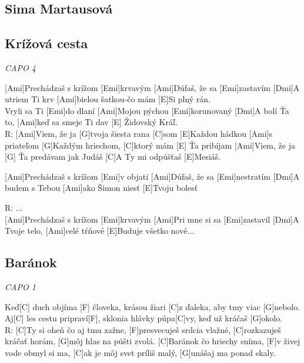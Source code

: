 \documentclass[10pt]{article}
\begin{document}
\begin{Large}
\section{Sima Martausová}

\begin{minipage}{\textwidth}
\subsection{Krížová cesta}
\textit{CAPO 4}
\begin{multicols}{2}
\begin{guitar}
	[Ami, Emi, Ami, Emi, Dm, Ami, E]
	
	[Ami]Prechádzaš s krížom [Emi]krvavým
	[Ami]Dúfaš, že sa [Emi]zastavím
	[Dmi]A utriem Ti krv [Ami]bielou šatkou-čo mám
	[E]Si plný rán.
	\\
	[Ami]Vryli sa Ti [Emi]do dlaní
	[Ami]Mojou pýchou [Emi]korunovaný
	[Dmi]A bolí Ťa to, [Ami]keď sa smeje Ti dav
	[E] Židovský Kráľ.
	\\
	R: [Ami]Viem, že ja [G]tvoja šiesta rana [C]som
	[E]Každou hádkou [Ami]s priateľom
	[G]Každým hriechom, [C]ktorý mám
	[E] Ťa pribíjam
	[Ami]Viem, že ja [G] Ťa predávam jak Judáš
	[C]A Ty mi odpúšťaš [E]Mesiáš.
	
	[Ami]Prechádzaš s krížom [Emi]v objatí
	[Ami]Dúfaš, že sa [Emi]nestratím
	[Dmi]A budem s Tebou [Ami]ako Šimon niesť
	[E]Tvoju bolesť
	
	R: ...
	\\
	[Ami, Emi, Ami, Emi, Dm, Ami, E]
	
	[Ami]Prechádzaš s krížom [Emi]krvavým
	[Ami]Pri mne si sa [Emi]zastavil
	[Dmi]A Tvoje telo, [Ami]celé tŕňové
	[E]Buduje všetko nové...
\end{guitar}
\end{multicols}
\end{minipage}

\begin{minipage}{\textwidth}
\subsection{Baránok}
\textit{CAPO 1}
\begin{multicols}{2}
\begin{guitar}
	[Intro: C F C G]
	
	Keď[C] duch objíma [F] človeka,
	krásou žiari [C]z ďaleka,
	aby tmy viac [G]nebolo.
	Aj[C] les cestu pripraví[F],
	sklonia hlávky púpa[C]vy,
	keď už kráčaš [G]okolo.
	\\
	R: [C]Ty si oheň čo aj tmu zažne,
	[F]presvecuješ srdcia vlažné,
	[C]rozkazuješ kráčať horám,
	[G]môj hlas na púšti zvolá.
	[C]Baránok čo hriechy sníma,
	[F]v živej vode obmyl si ma,
	[C]ak je môj svet príliš malý,
	[G]unášaj ma ponad skaly.
	\\
	[Medzihra (2x): C F C G]
	

\end{guitar}
\end{multicols}
\end{minipage}
\end{Large}
\end{document}
